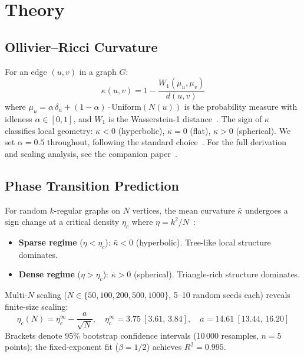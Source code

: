 \documentclass[11pt,a4paper]{article}
\newcommand{\kbar}{\bar{\kappa}}
\newcommand{\etac}{\eta_c}
\begin{document}
\section{Theory}
\label{sec:theory}

\subsection{Ollivier--Ricci Curvature}

For an edge $(u,v)$ in a graph $G$:
\begin{equation}
    \kappa(u,v) = 1 - \frac{W_1(\mu_u, \mu_v)}{d(u,v)}
    \label{eq:orc}
\end{equation}
where $\mu_u = \alpha\,\delta_u + (1-\alpha) \cdot \mathrm{Uniform}(N(u))$ is the probability measure with idleness $\alpha \in [0,1]$, and $W_1$ is the Wasserstein-1 distance~\cite{ollivier2009ricci}. The sign of $\kappa$ classifies local geometry: $\kappa < 0$ (hyperbolic), $\kappa = 0$ (flat), $\kappa > 0$ (spherical). We set $\alpha = 0.5$ throughout, following the standard choice~\cite{ollivier2009ricci,lin2011ricci,jost2014ollivier}. For the full derivation and scaling analysis, see the companion paper~\cite{paper1_theory}.

\subsection{Phase Transition Prediction}

For random $k$-regular graphs on $N$ vertices, the mean curvature $\kbar$ undergoes a sign change at a critical density $\etac$ where $\eta = k^2/N$~\cite{mitsche2024curvature,bounded2025orc}:
\begin{itemize}
    \item \textbf{Sparse regime} ($\eta < \etac$): $\kbar < 0$ (hyperbolic). Tree-like local structure dominates.
    \item \textbf{Dense regime} ($\eta > \etac$): $\kbar > 0$ (spherical). Triangle-rich structure dominates.
\end{itemize}

Multi-$N$ scaling ($N \in \{50, 100, 200, 500, 1000\}$, 5--10 random seeds each) reveals finite-size scaling:
\begin{equation}
    \etac(N) = \eta_c^\infty - \frac{a}{\sqrt{N}}, \quad \eta_c^\infty = 3.75\ [3.61,\,3.84], \quad a = 14.61\ [13.44,\,16.20]
    \label{eq:scaling}
\end{equation}
Brackets denote 95\% bootstrap confidence intervals (10\,000 resamples, $n=5$ points); the fixed-exponent fit ($\beta=1/2$) achieves $R^2=0.995$.
\end{document}
